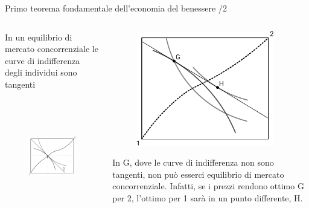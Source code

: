 \documentclass[aspectratio=64,12pt]{beamer}
\begin{document}
\begin{frame}{Primo teorema fondamentale dell’economia del benessere /2}
\begin{columns}
\begin{column}{.5\columnwidth}
In un equilibrio di mercato concorrenziale le curve di indifferenza degli individui sono tangenti

\begin{figure}[htbp]
\centering
\includegraphics[height=5cm]{./figure/edgeworth-4.pdf}
\end{figure}
\end{column}

\begin{column}{.5\columnwidth}
\begin{figure}[htbp]
\centering
\includegraphics[height=5cm]{./figure/edgeworth-5.pdf}
\end{figure}
\small
In G, dove le curve di indifferenza non sono tangenti, non può esserci equilibrio di mercato concorrenziale. Infatti, se i prezzi rendono ottimo G per 2, l’ottimo per 1 sarà in un punto differente, H.
\end{column}
\end{columns}
\end{frame}
\end{document}
